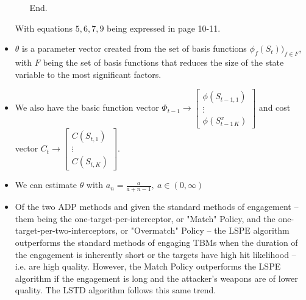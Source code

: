 \documentclass[12pt]{article} %
\begin{document}
\begin{itemize}
\begin{center}
\begin{enumerate}
            End.
        \end{enumerate}
        \end{center}
    With equations $5, 6, 7, 9$ being expressed in page 10-11.\\
    \vspace{0.25cm}
    \item $\theta$ is a parameter vector created from the set of basis functions $\phi_f(S_t))_{f\in F}$, with $F$ being the set of basis functions that reduces the size of the state variable to the most significant factors.
\item We also have the basic function vector $\Phi_{t-1} \rightarrow \left[\begin{array}{c} \phi(S_{t-1,1})  \\ \vdots \\ \phi(S_{t-1\,K}^x)\end{array} \right]$ and cost vector $C_{t} \rightarrow \left[\begin{array}{c} C(S_{t,1}) \\ \vdots \\ C(S_{t,K}) \end{array} \right]$.
\item We can estimate $\theta$ with $a_n = \frac{a}{a+n-1},\ a \in (0, \infty)$

\item Of the two ADP methods and given the standard methods of engagement -- them being the one-target-per-interceptor, or "Match" Policy, and the one-target-per-two-interceptors, or "Overmatch" Policy -- the LSPE algorithm outperforms the standard methods of engaging TBMs when the duration of the engagement is inherently short or the targets have high hit likelihood -- i.e. are high quality. However, the Match Policy outperforms the LSPE algorithm if the engagement is long and the attacker's weapons are of lower quality. The LSTD algorithm follows this same trend.
\end{itemize}
\newpage


\end{document}
